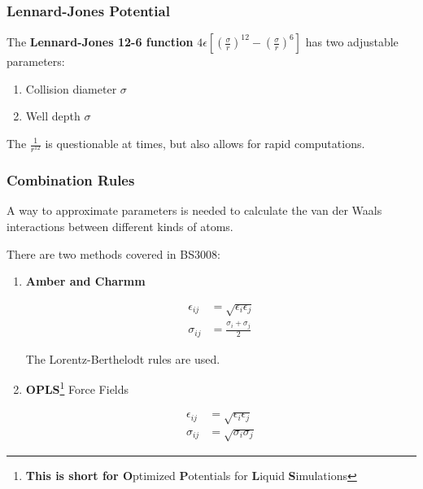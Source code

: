 \documentclass[
  letterpaper,
  DIV=11,
  numbers=noendperiod]{scrreprt}
\providecommand{\tightlist}{%
  \setlength{\itemsep}{0pt}\setlength{\parskip}{0pt}}\usepackage{longtable,booktabs,array}
\begin{document}
\hypertarget{lennard-jones-potential}{%
\subsubsection{Lennard-Jones Potential}\label{lennard-jones-potential}}

The \textbf{Lennard-Jones 12-6 function}
\(\displaystyle 4\epsilon\left[\left(\frac{\sigma}{r}\right)^{12} - \left(\frac{\sigma}{r}\right)^6\right]\)
has two adjustable parameters:

\begin{enumerate}
\def\labelenumi{\arabic{enumi}.}
\tightlist
\item
  Collision diameter \(\sigma\)
\item
  Well depth \(\sigma\)
\end{enumerate}

The \(\displaystyle \frac{1}{r^{12}}\) is questionable at times, but
also allows for rapid computations.

\hypertarget{combination-rules}{%
\subsubsection{Combination Rules}\label{combination-rules}}

A way to approximate parameters is needed to calculate the van der Waals
interactions between different kinds of atoms.

There are two methods covered in BS3008:

\begin{enumerate}
\def\labelenumi{\arabic{enumi}.}
\item
  \textbf{Amber and Charmm}

  \begin{align}
    \epsilon_{ij} &= \sqrt{\epsilon_i\epsilon_j} \\ 
    \sigma_{ij} &= \frac{\sigma_i + \sigma_j}{2}
  \end{align}

  The Lorentz-Berthelodt rules are used.
\item
  \textbf{OPLS}\footnote{\textbf{This is short for O}ptimized
    \textbf{P}otentials for \textbf{L}iquid \textbf{S}imulations} Force
  Fields

  \begin{align}
    \epsilon_{ij} &= \sqrt{\epsilon_i\epsilon_j} \\ 
    \sigma_{ij} &= \sqrt{\sigma_i\sigma_j}
  \end{align}
\end{enumerate}
\end{document}
